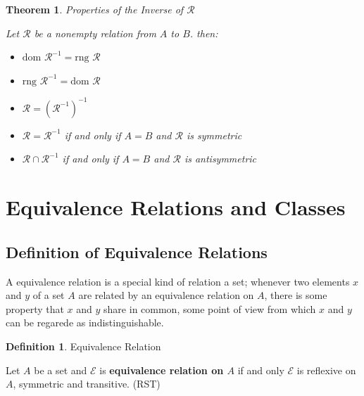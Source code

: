 \documentclass{book}
\newtheorem{theorem}{Theorem}[section]
\theoremstyle{definition}
\newtheorem{definition}{Definition}[section]
\theoremstyle{remark}
\newcommand{\cc}[1]{\mathcal{#1}}
\begin{document}
   \begin{theorem} 
        Properties of the Inverse of $\cc{R}$ \\
        
        \begin{tcolorbox}      
            Let $\cc{R}$ be a nonempty relation from $A$ to $B$. then: 
                \begin{itemize}
                    \item $\text{dom } \cc{R}^{-1} = \text{rng } \cc{R}$
                    \item $\text{rng } \cc{R}^{-1} = \text{dom } \cc{R}$
                    \item $\cc{R} = (\cc{R}^{-1})^{-1}$
                    \item $\cc{R} = \cc{R}^{-1}$ if and only if $A=B$ and $\cc{R}$ is symmetric
                    \item $\cc{R} \cap \cc{R}^{-1}$ if and only if $A=B$ and $\cc{R}$ is antisymmetric
                \end{itemize}
        \end{tcolorbox} 
    \end{theorem}



\section{Equivalence Relations and Classes}

\subsection{Definition of Equivalence Relations}

    A equivalence relation is a special kind of relation a set; whenever two elements $x$ and $y$ of a set $A$ are related by an equivalence relation on $A$, there is some property that $x$ and $y$ share in common, some point of view from which $x$ and $y$ can be regarede as indistinguishable. 

    \begin{definition}
        Equivalence Relation \\
        
        \begin{tcolorbox}
            Let $A$ be a set and $\cc{E}$ is \textbf{equivalence relation on $A$} if and only $\cc{E}$ is reflexive on $A$, symmetric and transitive. (RST)
        \end{tcolorbox}
    \end{definition}
\end{document}

